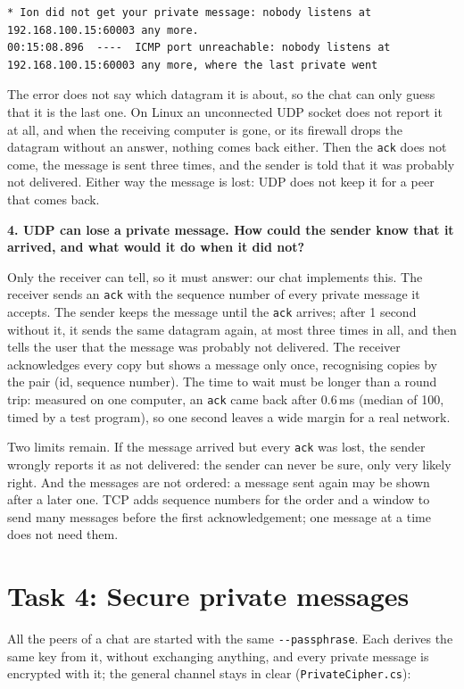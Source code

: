 \documentclass[11pt,a4paper]{article}
\newcommand{\question}[1]{\par\medskip\textbf{#1}\par}
\newcommand{\code}[1]{{\frenchspacing\texttt{#1}}}
\begin{document}
\begin{lstlisting}
* Ion did not get your private message: nobody listens at 192.168.100.15:60003 any more.
00:15:08.896  ----  ICMP port unreachable: nobody listens at 192.168.100.15:60003 any more, where the last private went
\end{lstlisting}

The error does not say which datagram it is about, so the chat can only guess that it is the last
one. On Linux an unconnected UDP socket does not report it at all, and when the receiving computer is
gone, or its firewall drops the datagram without an answer, nothing comes back either. Then the
\code{ack} does not come, the message is sent three times, and the sender is told that it was
probably not delivered. Either way the message is lost: UDP does not keep it for a peer that comes
back.

\question{4. UDP can lose a private message. How could the sender know that it arrived, and what
would it do when it did not?}

Only the receiver can tell, so it must answer: our chat implements this. The receiver sends an
\code{ack} with the sequence number of every private message it accepts. The sender keeps the
message until the \code{ack} arrives; after 1 second without it, it sends the same datagram again,
at most three times in all, and then tells the user that the message was probably not delivered.
The receiver acknowledges every copy but shows a message only once, recognising copies by the pair
(id, sequence number). The time to wait must be longer than a round trip: measured on one computer,
an \code{ack} came back after 0.6\,ms (median of 100, timed by a test program), so one second
leaves a wide margin for a real network.

Two limits remain. If the message arrived but every \code{ack} was lost, the sender wrongly reports
it as not delivered: the sender can never be sure, only very likely right. And the messages are not
ordered: a message sent again may be shown after a later one. TCP adds sequence numbers for the
order and a window to send many messages before the first acknowledgement; one message at a time
does not need them.

\section{Task 4: Secure private messages}

All the peers of a chat are started with the same \code{-{}-passphrase}. Each derives the same key
from it, without exchanging anything, and every private message is encrypted with it; the general
channel stays in clear (\code{PrivateCipher.cs}):
\end{document}

